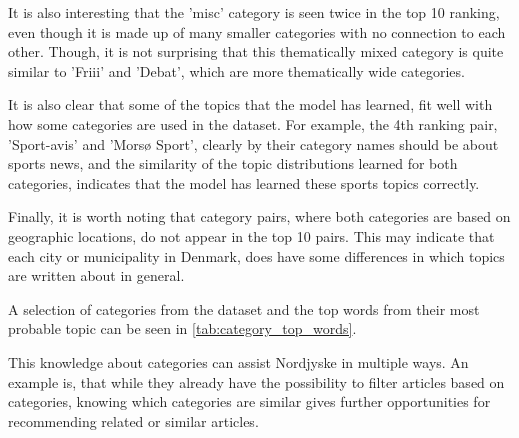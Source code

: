 It is also interesting that the 'misc' category is seen twice in the top 10 ranking, even though it is made up of many smaller categories with no connection to each other.
Though, it is not surprising that this thematically mixed category is quite similar to 'Friii' and 'Debat', which are more thematically wide categories.

It is also clear that some of the topics that the model has learned, fit well with how some categories are used in the dataset.
For example, the 4th ranking pair, 'Sport-avis' and 'Morsø Sport', clearly by their category names should be about sports news, and the similarity of the topic distributions learned for both categories, indicates that the model has learned these sports topics correctly.

Finally, it is worth noting that category pairs, where both categories are based on geographic locations, do not appear in the top 10 pairs.
This may indicate that each city or municipality in Denmark, does have some differences in which topics are written about in general.

A selection of categories from the dataset and the top words from their most probable topic can be seen in \autoref{tab:category_top_words}.

This knowledge about categories can assist Nordjyske in multiple ways.
An example is, that while they already have the possibility to filter articles based on categories, knowing which categories are similar gives further opportunities for recommending related or similar articles.
